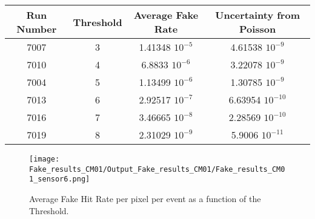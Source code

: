 \documentclass[a4papper, 11pt]{article}
\begin{document}
            \begin{center}
                \begin{tabular}{|c|c|c|c|}
                  \hline %
\rowcolor{light-gray}  Run Number  &   Threshold   &   Average Fake Rate    &   Uncertainty from Poisson         \tabularnewline
                  \hline %
                        7007    &       3       &  1.41348 $10^{-5}$  & 4.61538 $10^{-9}$ \tabularnewline
                  \hline %
                        7010    &       4       &  6.8833 $10^{-6}$  & 3.22078 $10^{-9}$ \tabularnewline
                  \hline %
                        7004    &       5       &  1.13499 $10^{-6}$  & 1.30785 $10^{-9}$ \tabularnewline
                  \hline %
                        7013    &       6       &  2.92517 $10^{-7}$  & 6.63954 $10^{-10}$ \tabularnewline
                  \hline %
                        7016    &       7       &  3.46665 $10^{-8}$  & 2.28569 $10^{-10}$ \tabularnewline
                  \hline %
                        7019    &       8       &  2.31029 $10^{-9}$  & 5.9006 $10^{-11}$ \tabularnewline
                  \hline %
                \end{tabular}
            \end{center}
        \begin{figure}[!h]
            \centering
            \texttt{[image: Fake\_results\_CM01/Output\_Fake\_results\_CM01/Fake\_results\_CM01\_sensor6.png]}
            \caption{Average Fake Hit Rate per pixel per event as a function of the Threshold.}
        \end{figure}
    \FloatBarrier 
\end{document}
